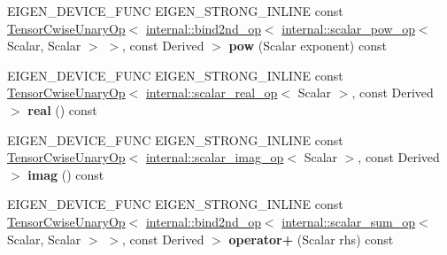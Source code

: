 \begin{DoxyCompactItemize}
\item 
\mbox{\label{class_eigen_1_1_tensor_base_3_01_derived_00_01_read_only_accessors_01_4_a3cc1012aa62df33ff0d92f38f7b01e77}} 
E\+I\+G\+E\+N\+\_\+\+D\+E\+V\+I\+C\+E\+\_\+\+F\+U\+NC E\+I\+G\+E\+N\+\_\+\+S\+T\+R\+O\+N\+G\+\_\+\+I\+N\+L\+I\+NE const \hyperlink{class_eigen_1_1_tensor_cwise_unary_op}{Tensor\+Cwise\+Unary\+Op}$<$ \hyperlink{struct_eigen_1_1internal_1_1bind2nd__op}{internal\+::bind2nd\+\_\+op}$<$ \hyperlink{struct_eigen_1_1internal_1_1scalar__pow__op}{internal\+::scalar\+\_\+pow\+\_\+op}$<$ Scalar, Scalar $>$ $>$, const Derived $>$ {\bfseries pow} (Scalar exponent) const
\item 
\mbox{\label{class_eigen_1_1_tensor_base_3_01_derived_00_01_read_only_accessors_01_4_a39d880af6e618792e3cb2b56498964d3}} 
E\+I\+G\+E\+N\+\_\+\+D\+E\+V\+I\+C\+E\+\_\+\+F\+U\+NC E\+I\+G\+E\+N\+\_\+\+S\+T\+R\+O\+N\+G\+\_\+\+I\+N\+L\+I\+NE const \hyperlink{class_eigen_1_1_tensor_cwise_unary_op}{Tensor\+Cwise\+Unary\+Op}$<$ \hyperlink{struct_eigen_1_1internal_1_1scalar__real__op}{internal\+::scalar\+\_\+real\+\_\+op}$<$ Scalar $>$, const Derived $>$ {\bfseries real} () const
\item 
\mbox{\label{class_eigen_1_1_tensor_base_3_01_derived_00_01_read_only_accessors_01_4_a0c243f6901a69a6445aa07322dd31002}} 
E\+I\+G\+E\+N\+\_\+\+D\+E\+V\+I\+C\+E\+\_\+\+F\+U\+NC E\+I\+G\+E\+N\+\_\+\+S\+T\+R\+O\+N\+G\+\_\+\+I\+N\+L\+I\+NE const \hyperlink{class_eigen_1_1_tensor_cwise_unary_op}{Tensor\+Cwise\+Unary\+Op}$<$ \hyperlink{struct_eigen_1_1internal_1_1scalar__imag__op}{internal\+::scalar\+\_\+imag\+\_\+op}$<$ Scalar $>$, const Derived $>$ {\bfseries imag} () const
\item 
\mbox{\label{class_eigen_1_1_tensor_base_3_01_derived_00_01_read_only_accessors_01_4_a61e6e0e87049a985e8721d9c2a3eeb95}} 
E\+I\+G\+E\+N\+\_\+\+D\+E\+V\+I\+C\+E\+\_\+\+F\+U\+NC E\+I\+G\+E\+N\+\_\+\+S\+T\+R\+O\+N\+G\+\_\+\+I\+N\+L\+I\+NE const \hyperlink{class_eigen_1_1_tensor_cwise_unary_op}{Tensor\+Cwise\+Unary\+Op}$<$ \hyperlink{struct_eigen_1_1internal_1_1bind2nd__op}{internal\+::bind2nd\+\_\+op}$<$ \hyperlink{struct_eigen_1_1internal_1_1scalar__sum__op}{internal\+::scalar\+\_\+sum\+\_\+op}$<$ Scalar, Scalar $>$ $>$, const Derived $>$ {\bfseries operator+} (Scalar rhs) const

\end{DoxyCompactItemize}
